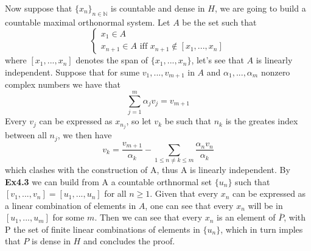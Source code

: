 \documentclass{article}
\begin{document}
\begin{exercise}
Now suppose that $\{x_n\}_{n \in \mathbb{N}}$ is countable and dense in $H$, we are going to build a countable maximal orthonormal system. Let $A$ be the set such that
\[
   \begin{cases}
      x_1 \in A \\
      x_{n+1} \in A \text{ iff } x_{n+1} \notin [ x_1, ..., x_n ]
   \end{cases} 
\]
where $[x_1, ..., x_n]$ denotes the span of $\{x_1, ..., x_n\}$, let's see that $A$ is linearly independent. Suppose that for sume $v_1, ..., v_{m+1}$ in $A$ and $\alpha_1, ..., \alpha_m$ nonzero complex numbers we have that
\[
    \sum_{j=1}^{m} \alpha_j v_j = v_{m+1}
\]
Every $v_j$ can be expressed as $x_{n_j}$, so let $v_k$ be such that $n_k$ is the greates index between all $n_j$, we then have
\[
    v_k = \frac{v_{m+1}}{\alpha_k} - \sum_{1 \le n \neq k \le m} \frac{\alpha_n v_n}{\alpha_k}
\]
which clashes with the construction of A, thus A is linearly independent. By \textbf{Ex4.3} we can build from A a countable orthnormal set $\{u_n\}$ such that $[v_1, ..., v_n] = [u_1, ..., u_n]$ for all $n \ge 1$. Given that every $x_n$ can be expressed as a linear combination of elements in $A$, one can see that every $x_n$ will be in $[u_1, ..., u_m]$ for some $m$. Then we can see that every $x_n$ is an element of $\overline{P}$, with P the set of finite linear combinations of elements in $\{u_n\}$, which in turn imples that $P$ is dense in $H$ and concludes the proof. 
\end{exercise}

\bigbreak
\end{document}
